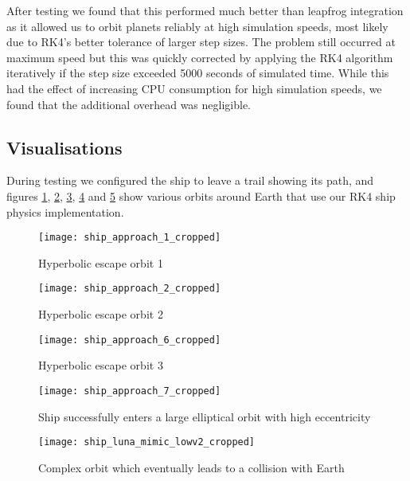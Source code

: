 After testing we found that this performed much better than leapfrog integration as it allowed us to orbit planets reliably at high simulation speeds, most likely due to RK4's better tolerance of larger step sizes.  The problem still occurred at maximum speed but this was quickly corrected by applying the RK4 algorithm iteratively if the step size exceeded 5000 seconds of simulated time.  While this had the effect of increasing CPU consumption for high simulation speeds, we found that the additional overhead was negligible.

\subsection{Visualisations}

During testing we configured the ship to leave a trail showing its path, and figures \ref{ShipPhysics1}, \ref{ShipPhysics2}, \ref{ShipPhysics3}, \ref{ShipPhysics4} and \ref{ShipPhysics6} show various orbits around Earth that use our RK4 ship physics implementation.

\begin{figure}[!htbp]
  \begin{center}
    \leavevmode
    \ifpdf
      \texttt{[image: ship\_approach\_1\_cropped]}
    \fi
    \caption{Hyperbolic escape orbit 1}
    \label{ShipPhysics1}
  \end{center}
\end{figure}

\begin{figure}[!htbp]
  \begin{center}
    \leavevmode
    \ifpdf
      \texttt{[image: ship\_approach\_2\_cropped]}
    \fi
    \caption{Hyperbolic escape orbit 2}
    \label{ShipPhysics2}
  \end{center}
\end{figure}

\begin{figure}[!htbp]
  \begin{center}
    \leavevmode
    \ifpdf
      \texttt{[image: ship\_approach\_6\_cropped]}
    \fi
    \caption{Hyperbolic escape orbit 3}
    \label{ShipPhysics3}
  \end{center}
\end{figure}

\begin{figure}[!htbp]
  \begin{center}
    \leavevmode
    \ifpdf
      \texttt{[image: ship\_approach\_7\_cropped]}
    \fi
    \caption{Ship successfully enters a large elliptical orbit with high eccentricity}
    \label{ShipPhysics4}
  \end{center}
\end{figure}

\begin{figure}[!htbp]
  \begin{center}
    \leavevmode
    \ifpdf
      \texttt{[image: ship\_luna\_mimic\_lowv2\_cropped]}
    \fi
    \caption{Complex orbit which eventually leads to a collision with Earth}
    \label{ShipPhysics6}
  \end{center}
\end{figure}